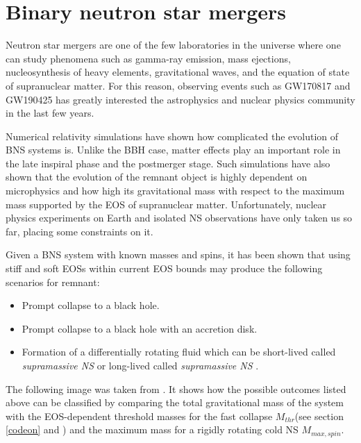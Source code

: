 \chapter{Binary neutron star mergers}\label{BNS-merg}

Neutron star mergers are one of the few laboratories in the universe where one can study phenomena such as gamma-ray emission, mass ejections, nucleosynthesis of heavy elements, gravitational waves, and the equation of state of supranuclear matter. For this reason,  observing events such as GW170817 and GW190425 has greatly interested the astrophysics and nuclear physics community in the last few years.
 
Numerical relativity simulations have shown how complicated the evolution of BNS systems is. Unlike the BBH case, matter effects play an important role in the late inspiral phase and the postmerger stage. Such simulations have also shown that the evolution of the remnant object is highly dependent on microphysics and how high its gravitational mass with respect to the maximum mass supported by the EOS of supranuclear matter. Unfortunately, nuclear physics experiments on Earth and isolated NS observations have only taken us so far, placing some constraints on it.

Given a BNS system with known masses and spins, it has been shown that using stiff and soft EOSs within current EOS bounds may produce the following scenarios for remnant:

\begin{itemize}
\item Prompt collapse to a black hole.
\item Prompt collapse to a black hole with an accretion disk.
\item Formation of a differentially rotating fluid which can be short-lived called \textit{supramassive NS} or long-lived called \textit{supramassive NS} \cite{Shibata:2019wef, Kastaun_2021}.
\end{itemize}


The following image was taken from \cite{Shibata:2019wef}. It shows how the possible outcomes listed above can be classified by comparing the total gravitational mass of the system with the EOS-dependent threshold masses for the fast collapse $M_{thr}$(see section \ref{codeon} and \cite{Kashyap_2022}) and the maximum mass for a rigidly rotating cold NS $M_{max,spin}$.




